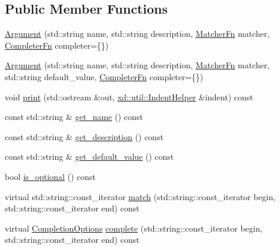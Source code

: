 \subsection*{Public Member Functions}
\begin{DoxyCompactItemize}
\item 
\mbox{\hyperlink{classxd_1_1repl_1_1cmd_1_1_argument_a8260fe4187d130feec98554d0fae8f08}{Argument}} (std\+::string name, std\+::string description, \mbox{\hyperlink{classxd_1_1repl_1_1cmd_1_1_argument_a7284341abe139b035abfc7e1dca5d42e}{Matcher\+Fn}} matcher, \mbox{\hyperlink{classxd_1_1repl_1_1cmd_1_1_argument_ae3fcd7357ab584e17d2fb86c1f077fe9}{Completer\+Fn}} completer=\{\})
\item 
\mbox{\hyperlink{classxd_1_1repl_1_1cmd_1_1_argument_afad52ea261c337709515b2a85bf435ad}{Argument}} (std\+::string name, std\+::string description, \mbox{\hyperlink{classxd_1_1repl_1_1cmd_1_1_argument_a7284341abe139b035abfc7e1dca5d42e}{Matcher\+Fn}} matcher, std\+::string default\+\_\+value, \mbox{\hyperlink{classxd_1_1repl_1_1cmd_1_1_argument_ae3fcd7357ab584e17d2fb86c1f077fe9}{Completer\+Fn}} completer=\{\})
\item 
void \mbox{\hyperlink{classxd_1_1repl_1_1cmd_1_1_argument_afe4be75f7aebddd6d5d1c59fea3867ca}{print}} (std\+::ostream \&out, \mbox{\hyperlink{classxd_1_1util_1_1_indent_helper}{xd\+::util\+::\+Indent\+Helper}} \&indent) const
\item 
const std\+::string \& \mbox{\hyperlink{classxd_1_1repl_1_1cmd_1_1_argument_a7ec62a434676c646516a489d19ef3522}{get\+\_\+name}} () const
\item 
const std\+::string \& \mbox{\hyperlink{classxd_1_1repl_1_1cmd_1_1_argument_a4681847333a750f6b98018da8dc32f54}{get\+\_\+description}} () const
\item 
const std\+::string \& \mbox{\hyperlink{classxd_1_1repl_1_1cmd_1_1_argument_ab113923392ceb6f8d3e69cb3834445fb}{get\+\_\+default\+\_\+value}} () const
\item 
bool \mbox{\hyperlink{classxd_1_1repl_1_1cmd_1_1_argument_a8c209c3e564d7ac9cfa3298dc922b266}{is\+\_\+optional}} () const
\item 
virtual std\+::string\+::const\+\_\+iterator \mbox{\hyperlink{classxd_1_1repl_1_1cmd_1_1_argument_a93d62e7f5892280bbc57a133d6f66cab}{match}} (std\+::string\+::const\+\_\+iterator begin, std\+::string\+::const\+\_\+iterator end) const
\item 
virtual \mbox{\hyperlink{classxd_1_1repl_1_1cmd_1_1_argument_a633ddaf50445b1f77d11d7e3bf0c4ea8}{Completion\+Options}} \mbox{\hyperlink{classxd_1_1repl_1_1cmd_1_1_argument_a2961111a35cbbf16ba18300ae6dd8efc}{complete}} (std\+::string\+::const\+\_\+iterator begin, std\+::string\+::const\+\_\+iterator end) const
\end{DoxyCompactItemize}


